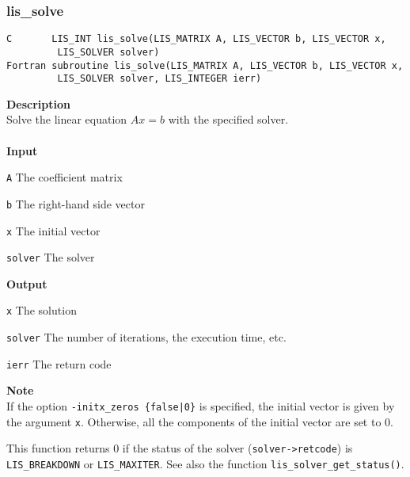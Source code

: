 \documentclass[a4paper]{article}
\newcommand{\namelistlabel}[1]{\mbox{#1}\hfill}
\newenvironment{namelist}[1]{%
\begin{list}{}
  {\let\makelabel\namelistlabel
  \settowidth{\labelwidth}{#1}
  \setlength{\leftmargin}{1.1\labelwidth}}
  }{%
\end{list}}
\begin{document}
\subsubsection{lis\_solve}
\begin{screen}
\verb|C       LIS_INT lis_solve(LIS_MATRIX A, LIS_VECTOR b, LIS_VECTOR x,|\\
\verb|         LIS_SOLVER solver)|\\
\verb|Fortran subroutine lis_solve(LIS_MATRIX A, LIS_VECTOR b, LIS_VECTOR x,|\\
\verb|         LIS_SOLVER solver, LIS_INTEGER ierr)|
\end{screen}
{\bf Description}\\
\indent
Solve the linear equation $Ax = b$ with the specified solver.
\\ \\
\noindent
{\bf Input}
\begin{namelist}{XXXXXXXXXXXXXXXXXXXX}
\item[\tt A] The coefficient matrix
\item[\tt b] The right-hand side vector
\item[\tt x] The initial vector
\item[\tt solver] The solver
\end{namelist}
{\bf Output}
\begin{namelist}{XXXXXXXXXXXXXXXXXXXX}
\item[\tt x] The solution
\item[\tt solver] The number of iterations, the execution time, etc.
\item[\tt ierr] The return code
\end{namelist}
{\bf Note}\\
\indent
If the option {\tt -initx\_zeros \{false|0\}} is specified, the initial
vector is given by the argument {\tt x}.
Otherwise, all the components of the initial vector are set to $0$.

This function returns 0 if the status of the solver ({\tt solver->retcode})
is {\tt LIS\_BREAKDOWN} or {\tt LIS\_MAXITER}. See also the function
{\tt lis\_solver\_get\_status()}. 

\newpage
\end{document}
